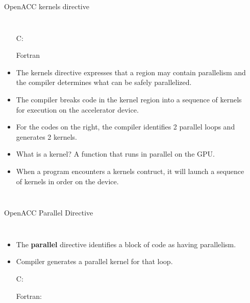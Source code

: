 \documentclass[10pt,t]{beamer}
\begin{document}
\begin{frame}[fragile]{\small OpenACC kernels directive}
  \begin{columns}
    \begin{itemize}
      \item[C:] 
      \item[Fortran] 
      \item The kernels directive expresses that a region may contain parallelism and the compiler determines what can be safely parallelized.
      \item The compiler breaks code in the kernel region into a sequence of kernels for execution on the accelerator device.
      \item For the codes on the right, the compiler identifies 2 parallel loops and generates 2 kernels.
      \item {\color{red}What is a kernel?} {\color{DarkGreen}A function that runs in parallel on the GPU.}
      \item When a program encounters a kernels contruct, it will launch a sequence of kernels in order on the device.
    \end{itemize}
    \begin{exampleblock}{}
      
      
    \end{exampleblock}
  \end{columns}
\end{frame}

\begin{frame}[fragile]{\small OpenACC Parallel Directive}
  \begin{columns}
    \begin{itemize}
      \item The {\bf parallel} directive identifies a block of code as having parallelism.
      \item Compiler generates a parallel kernel for that loop.
      \item[C:] 
      \item[Fortran:] 
    \end{itemize}
    \begin{exampleblock}{}
      
      
    \end{exampleblock}
  \end{columns}
\end{frame}
\end{document}
